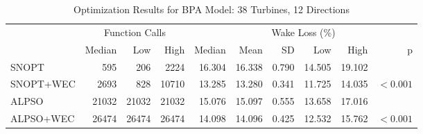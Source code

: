 \documentclass[a4paper]{jpconf}
\begin{document}
\begin{table}
	\centering
	\caption{Optimization Results for BPA Model: 38 Turbines, 12 Directions}
	\begin{tabular}{lrrrrrrrrr}
		\toprule
		{} & \multicolumn{3}{c}{Function Calls} & \multicolumn{6}{c}{Wake Loss (\%)} \\
		\cmidrule(lr){2-4} \cmidrule(lr){5-10}
		{} &         Median &    Low &   High &        Median &   Mean &    SD &    Low &   High &          p \\
		\cmidrule(lr){2-4} \cmidrule(lr){5-10}
		SNOPT     &            595 &    206 &   2224 &        16.304 & 16.338 & 0.790 & 14.505 & 19.102 &            \\
		SNOPT+WEC &           2693 &    828 &  10710 &        13.285 & 13.280 & 0.341 & 11.725 & 14.035 &  $< 0.001$ \\
		ALPSO     &          21032 &  21032 &  21032 &        15.076 & 15.097 & 0.555 & 13.658 & 17.016 &            \\
		ALPSO+WEC &          26474 &  26474 &  26474 &        14.098 & 14.096 & 0.425 & 12.532 & 15.762 &  $< 0.001$ \\
		\bottomrule
	\end{tabular}
\end{table}
\end{document}
